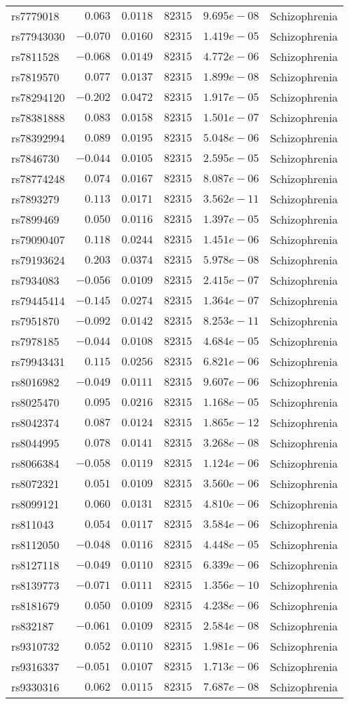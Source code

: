 \begin{tabular}{lrrrrl}
rs7779018&$ 0.063$&$0.0118$&$ 82315$&$9.695e-08$&Schizophrenia\tabularnewline
rs77943030&$-0.070$&$0.0160$&$ 82315$&$1.419e-05$&Schizophrenia\tabularnewline
rs7811528&$-0.068$&$0.0149$&$ 82315$&$4.772e-06$&Schizophrenia\tabularnewline
rs7819570&$ 0.077$&$0.0137$&$ 82315$&$1.899e-08$&Schizophrenia\tabularnewline
rs78294120&$-0.202$&$0.0472$&$ 82315$&$1.917e-05$&Schizophrenia\tabularnewline
rs78381888&$ 0.083$&$0.0158$&$ 82315$&$1.501e-07$&Schizophrenia\tabularnewline
rs78392994&$ 0.089$&$0.0195$&$ 82315$&$5.048e-06$&Schizophrenia\tabularnewline
rs7846730&$-0.044$&$0.0105$&$ 82315$&$2.595e-05$&Schizophrenia\tabularnewline
rs78774248&$ 0.074$&$0.0167$&$ 82315$&$8.087e-06$&Schizophrenia\tabularnewline
rs7893279&$ 0.113$&$0.0171$&$ 82315$&$3.562e-11$&Schizophrenia\tabularnewline
rs7899469&$ 0.050$&$0.0116$&$ 82315$&$1.397e-05$&Schizophrenia\tabularnewline
rs79090407&$ 0.118$&$0.0244$&$ 82315$&$1.451e-06$&Schizophrenia\tabularnewline
rs79193624&$ 0.203$&$0.0374$&$ 82315$&$5.978e-08$&Schizophrenia\tabularnewline
rs7934083&$-0.056$&$0.0109$&$ 82315$&$2.415e-07$&Schizophrenia\tabularnewline
rs79445414&$-0.145$&$0.0274$&$ 82315$&$1.364e-07$&Schizophrenia\tabularnewline
rs7951870&$-0.092$&$0.0142$&$ 82315$&$8.253e-11$&Schizophrenia\tabularnewline
rs7978185&$-0.044$&$0.0108$&$ 82315$&$4.684e-05$&Schizophrenia\tabularnewline
rs79943431&$ 0.115$&$0.0256$&$ 82315$&$6.821e-06$&Schizophrenia\tabularnewline
rs8016982&$-0.049$&$0.0111$&$ 82315$&$9.607e-06$&Schizophrenia\tabularnewline
rs8025470&$ 0.095$&$0.0216$&$ 82315$&$1.168e-05$&Schizophrenia\tabularnewline
rs8042374&$ 0.087$&$0.0124$&$ 82315$&$1.865e-12$&Schizophrenia\tabularnewline
rs8044995&$ 0.078$&$0.0141$&$ 82315$&$3.268e-08$&Schizophrenia\tabularnewline
rs8066384&$-0.058$&$0.0119$&$ 82315$&$1.124e-06$&Schizophrenia\tabularnewline
rs8072321&$ 0.051$&$0.0109$&$ 82315$&$3.560e-06$&Schizophrenia\tabularnewline
rs8099121&$ 0.060$&$0.0131$&$ 82315$&$4.810e-06$&Schizophrenia\tabularnewline
rs811043&$ 0.054$&$0.0117$&$ 82315$&$3.584e-06$&Schizophrenia\tabularnewline
rs8112050&$-0.048$&$0.0116$&$ 82315$&$4.448e-05$&Schizophrenia\tabularnewline
rs8127118&$-0.049$&$0.0110$&$ 82315$&$6.339e-06$&Schizophrenia\tabularnewline
rs8139773&$-0.071$&$0.0111$&$ 82315$&$1.356e-10$&Schizophrenia\tabularnewline
rs8181679&$ 0.050$&$0.0109$&$ 82315$&$4.238e-06$&Schizophrenia\tabularnewline
rs832187&$-0.061$&$0.0109$&$ 82315$&$2.584e-08$&Schizophrenia\tabularnewline
rs9310732&$ 0.052$&$0.0110$&$ 82315$&$1.981e-06$&Schizophrenia\tabularnewline
rs9316337&$-0.051$&$0.0107$&$ 82315$&$1.713e-06$&Schizophrenia\tabularnewline
rs9330316&$ 0.062$&$0.0115$&$ 82315$&$7.687e-08$&Schizophrenia\tabularnewline

\end{tabular}
